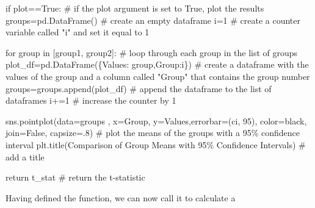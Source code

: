 \documentclass[
  letterpaper,
  DIV=11,
  numbers=noendperiod]{scrreprt}
\newenvironment{Shaded}{\begin{snugshade}}{\end{snugshade}}
\newcommand{\CommentTok}[1]{\textcolor[rgb]{0.37,0.37,0.37}{#1}}
\newcommand{\ControlFlowTok}[1]{\textcolor[rgb]{0.00,0.23,0.31}{#1}}
\newcommand{\DecValTok}[1]{\textcolor[rgb]{0.68,0.00,0.00}{#1}}
\newcommand{\FloatTok}[1]{\textcolor[rgb]{0.68,0.00,0.00}{#1}}
\newcommand{\KeywordTok}[1]{\textcolor[rgb]{0.00,0.23,0.31}{#1}}
\newcommand{\NormalTok}[1]{\textcolor[rgb]{0.00,0.23,0.31}{#1}}
\newcommand{\OperatorTok}[1]{\textcolor[rgb]{0.37,0.37,0.37}{#1}}
\newcommand{\StringTok}[1]{\textcolor[rgb]{0.13,0.47,0.30}{#1}}
\newcommand{\VariableTok}[1]{\textcolor[rgb]{0.07,0.07,0.07}{#1}}
\begin{document}
\begin{Shaded}
\begin{Highlighting}[]
    \ControlFlowTok{if}\NormalTok{ plot}\OperatorTok{==}\VariableTok{True}\NormalTok{: }\CommentTok{\# if the plot argument is set to True, plot the results}
\NormalTok{        groups}\OperatorTok{=}\NormalTok{pd.DataFrame() }\CommentTok{\# create an empty dataframe}
\NormalTok{        i}\OperatorTok{=}\DecValTok{1} \CommentTok{\# create a counter variable called "i" and set it equal to 1}
        
        \ControlFlowTok{for}\NormalTok{ group }\KeywordTok{in}\NormalTok{ [group1, group2]: }\CommentTok{\# loop through each group in the list of groups}
\NormalTok{            plot\_df}\OperatorTok{=}\NormalTok{pd.DataFrame(\{}\StringTok{\textquotesingle{}Values\textquotesingle{}}\NormalTok{: group,}\StringTok{\textquotesingle{}Group\textquotesingle{}}\NormalTok{:i\}) }\CommentTok{\# create a dataframe with the values of the group and a column called "Group" that contains the group number}
\NormalTok{            groups}\OperatorTok{=}\NormalTok{groups.append(plot\_df) }\CommentTok{\# append the dataframe to the list of dataframes}
\NormalTok{            i}\OperatorTok{+=}\DecValTok{1} \CommentTok{\# increase the counter by 1}
        
\NormalTok{        sns.pointplot(data}\OperatorTok{=}\NormalTok{groups , x}\OperatorTok{=}\StringTok{\textquotesingle{}Group\textquotesingle{}}\NormalTok{, y}\OperatorTok{=}\StringTok{\textquotesingle{}Values\textquotesingle{}}\NormalTok{,errorbar}\OperatorTok{=}\NormalTok{(}\StringTok{\textquotesingle{}ci\textquotesingle{}}\NormalTok{, }\DecValTok{95}\NormalTok{), color}\OperatorTok{=}\StringTok{\textquotesingle{}black\textquotesingle{}}\NormalTok{, join}\OperatorTok{=}\VariableTok{False}\NormalTok{, capsize}\OperatorTok{=}\FloatTok{.8}\NormalTok{) }\CommentTok{\# plot the means of the groups with a 95\% confidence interval}
\NormalTok{        plt.title(}\StringTok{\textquotesingle{}Comparison of Group Means with 95\% Confidence Intervals\textquotesingle{}}\NormalTok{) }\CommentTok{\# add a title}
    
    \ControlFlowTok{return}\NormalTok{ t\_stat }\CommentTok{\# return the t{-}statistic}
\end{Highlighting}
\end{Shaded}

Having defined the function, we can now call it to calculate a
\end{document}
